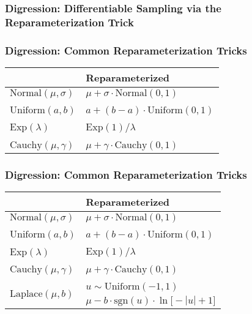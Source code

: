 \documentclass{beamer}
\begin{document}
\begin{frame}
  \frametitle{Digression: Differentiable Sampling via the Reparameterization Trick}

\end{frame}


\begin{frame}
  \frametitle{Digression: Common Reparameterization Tricks}
  \begin{center}
  \begin{tabular}{C{5cm}C{5cm}}
  \toprule
  {} & Reparameterized \\
  \midrule
  $\text{Normal}(\mu, \sigma)$   &  $\mu + \sigma \cdot \text{Normal}(0, 1)$ \\
  \\
  $\text{Uniform}(a, b)$   &  $a + (b - a) \cdot \text{Uniform}(0, 1)$ \\
  \\
  $\text{Exp}(\lambda)$   &  $\text{Exp}(1) / \lambda$ \\
  \\
  $\text{Cauchy}(\mu, \gamma)$   &  $\mu + \gamma \cdot \text{Cauchy}(0, 1)$ \\
  \bottomrule
  \end{tabular}
  \end{center}
\end{frame}

\begin{frame}
  \frametitle{Digression: Common Reparameterization Tricks}
  \begin{center}
  \begin{tabular}{C{5cm}C{5cm}}
  \toprule
  {} & Reparameterized \\
  \midrule
  $\text{Normal}(\mu, \sigma)$   &  $\mu + \sigma \cdot \text{Normal}(0, 1)$ \\
  \\
  $\text{Uniform}(a, b)$   &  $a + (b - a) \cdot \text{Uniform}(0, 1)$ \\
  \\
  $\text{Exp}(\lambda)$   &  $\text{Exp}(1) / \lambda$ \\
  \\
  $\text{Cauchy}(\mu, \gamma)$   &  $\mu + \gamma \cdot \text{Cauchy}(0, 1)$ \\
  \\
    &  $u \sim \text{Uniform}(-1, 1)$ \\
                                          & $\mu - b \cdot \text{sgn}(u) \cdot \ln \big[-|u|+1 \big]$ \\
  \bottomrule
  \end{tabular}
  \end{center}
\end{frame}
\end{document}
